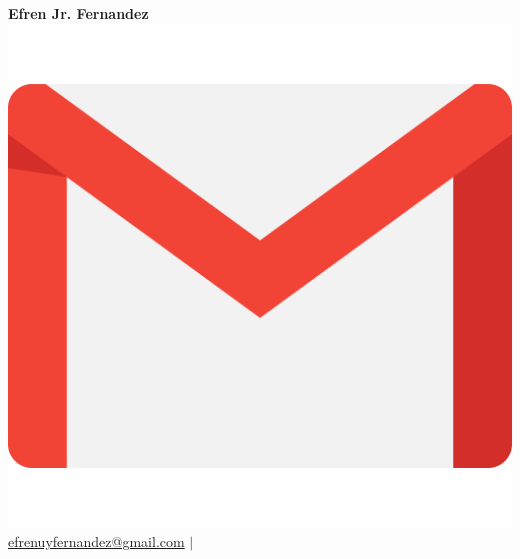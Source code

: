\documentclass[a4paper,20pt]{article}
\begin{document}
\begin{center}
    {\huge \textbf{Efren Jr. Fernandez}} \vspace{5pt}\\ %
    \includegraphics[scale = 0.02]{images/Gmail_icon_(2020).png} \href{mailto:}{efrenuyfernandez@gmail.com} $\vert$

\end{center}
\end{document}
